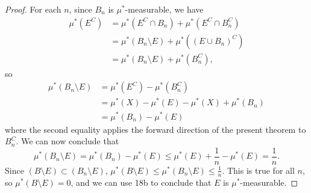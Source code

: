 \documentclass{article}
\theoremstyle{definition}
\begin{document}
\begin{proof}
	For each $n$, since $B_n$ is $\mu^*$-measurable, we have \begin{align*}
		\mu^*(E^C) & = \mu^*(E^C \cap B_n) + \mu^*(E^C \cap B_n^C)    \\
		           & = \mu^*(B_n \setminus E) + \mu^*((E \cup B_n)^C) \\
		           & = \mu^*(B_n \setminus E) + \mu^*(B_n^C),
	\end{align*}
	so \begin{align*}
		\mu^*(B_n \setminus E) & = \mu^*(E^C) - \mu^*(B_n^C)                   \\
		                       & = \mu^*(X) - \mu^*(E) - \mu^*(X) + \mu^*(B_n) \\
		                       & = \mu^*(B_n) - \mu^*(E)
	\end{align*}
	where the second equality applies the forward direction of the present theorem to $B_n^C$.
	We can now conclude that \begin{equation*}
		\mu^*(B_n \setminus E) = \mu^*(B_n) - \mu^*(E) \leq \mu^*(E) + \frac{1}{n} - \mu^*(E) = \frac{1}{n}.
	\end{equation*}
	Since $(B \setminus E) \subset (B_n \setminus E)$, $\mu^*(B \setminus E) \leq \mu^*(B_n \setminus E) \leq \frac{1}{n}$.
	This is true for all $n$, so $\mu^*(B \setminus E) = 0$, and we can use 18b to conclude that $E$ is $\mu^*$-measurable.
\end{proof}
\end{document}

